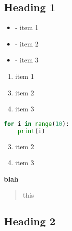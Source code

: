 \documentclass{article}
\begin{document}
 
\setcounter{secnumdepth}{0}

\subsection{Heading 1}

\begin{itemize}
    \item - item 1
    \item - item 2
    \item - item 3
\end{itemize}

\begin{enumerate}
    \setcounter{enumi}{0}
    \item item 1
\end{enumerate}

\begin{enumerate}
    \setcounter{enumi}{2}
    \item item 2
    \item item 3
\end{enumerate}

\begin{lstlisting}[language=python, style=myStyle]
for i in range(10):
    print(i)
\end{lstlisting}

\begin{enumerate}
    \setcounter{enumi}{2}
    \item item 2
    \item item 3
\end{enumerate}

\textbf{blah}
\begin{quote}
    this
\end{quote}

\subsection{Heading 2}
\end{document}
